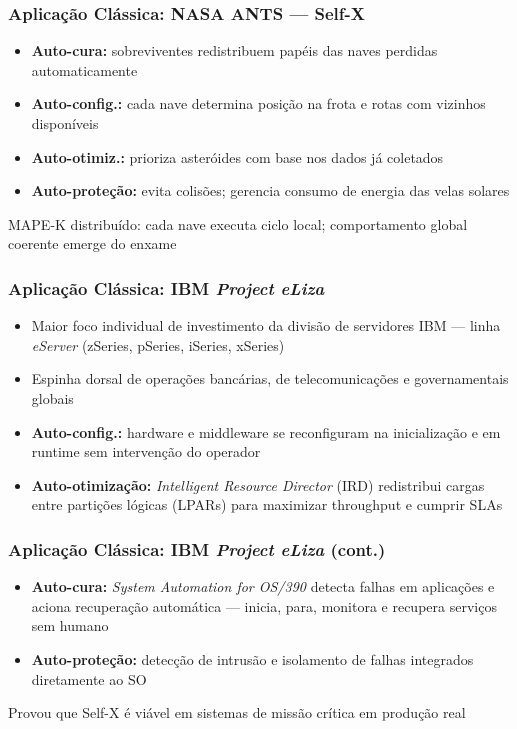 \documentclass{beamer}
\begin{document}
  \begin{frame}
    \frametitle{Aplicação Clássica: NASA ANTS --- Self-X}
    \begin{itemize}
      \item \textbf{Auto-cura:} sobreviventes redistribuem papéis das naves perdidas automaticamente
      \item \textbf{Auto-config.:} cada nave determina posição na frota e rotas com vizinhos disponíveis
      \item \textbf{Auto-otimiz.:} prioriza asteróides com base nos dados já coletados
      \item \textbf{Auto-proteção:} evita colisões; gerencia consumo de energia das velas solares
    \end{itemize}
    \vspace{0.3cm}
    \begin{block}{}
      MAPE-K distribuído: cada nave executa ciclo local; comportamento global coerente emerge do enxame
    \end{block}
  \end{frame}

  \begin{frame}
    \frametitle{Aplicação Clássica: IBM \textit{Project eLiza}}
    \begin{itemize}
      \item Maior foco individual de investimento da divisão de servidores IBM --- linha \textit{eServer} (zSeries, pSeries, iSeries, xSeries)
      \item Espinha dorsal de operações bancárias, de telecomunicações e governamentais globais
      \item \textbf{Auto-config.:} hardware e middleware se reconfiguram na inicialização e em runtime sem intervenção do operador
      \item \textbf{Auto-otimização:} \textit{Intelligent Resource Director} (IRD) redistribui cargas entre partições lógicas (LPARs) para maximizar throughput e cumprir SLAs
    \end{itemize}
  \end{frame}

  \begin{frame}
    \frametitle{Aplicação Clássica: IBM \textit{Project eLiza} (cont.)}
    \begin{itemize}
      \item \textbf{Auto-cura:} \textit{System Automation for OS/390} detecta falhas em aplicações e aciona recuperação automática --- inicia, para, monitora e recupera serviços sem humano
      \item \textbf{Auto-proteção:} detecção de intrusão e isolamento de falhas integrados diretamente ao SO
    \end{itemize}
    \vspace{0.4cm}
    \begin{alertblock}{}
      Provou que Self-X é viável em sistemas de missão crítica em produção real
    \end{alertblock}
  \end{frame}
\end{document}
